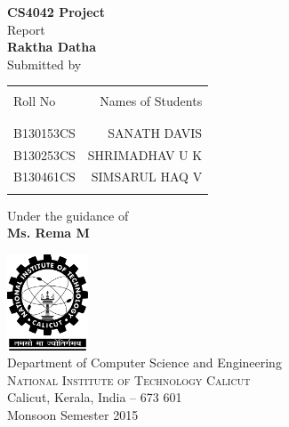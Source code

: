 \begin{titlepage}

\begin{center}

\textup{\small {\bf CS4042 Project} \\ Report}\\[0.2in]

\Large \textbf {Raktha Datha}\\[0.5in]



\normalsize Submitted by \\
\begin{table}[h]
\centering
\begin{tabular}{lr}\hline \\
Roll No & Names of Students \\ \\ \hline
\\
B130153CS & SANATH DAVIS \\
B130253CS & SHRIMADHAV U K \\
B130461CS & SIMSARUL HAQ V \\ \\ \hline
\end{tabular}
\end{table}

\vspace{.1in}
Under the guidance of\\
{\textbf{Ms. Rema M}}\\[0.2in]

\vfill

\includegraphics[width=0.18\textwidth]{./nitc-logo}\\[0.1in]
\Large{Department of Computer Science and Engineering}\\
\normalsize
\textsc{National Institute of Technology Calicut}\\
Calicut, Kerala, India -- 673 601 \\
\vspace{0.2cm}
Monsoon Semester 2015

\end{center}

\end{titlepage}
